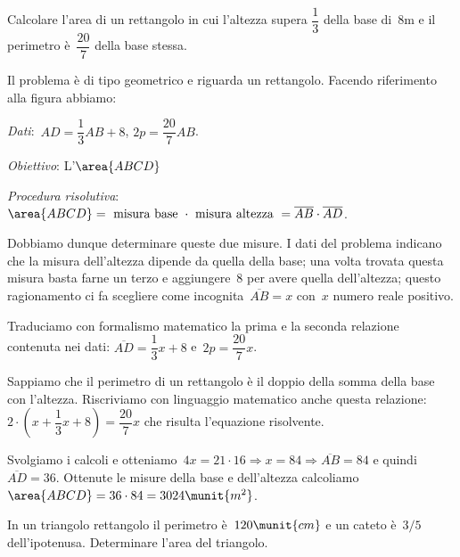 \begin{problema}{}{}
 Calcolare l'area di un rettangolo in cui
l'altezza supera \(\dfrac{1}{3}\) della base di~8m e il
perimetro è~\(\dfrac{20}{7}\) della base stessa.
\end{problema}

\begin{soluzione}
 Il problema è di tipo geometrico e riguarda un rettangolo. Facendo riferimento 
alla figura abbiamo:
\begin{htmulticols}{2}
 \emph{Dati}:~\(AD=\dfrac{1}{3}AB+8\), \(2p=\dfrac{20}{7}AB\).

\emph{Obiettivo}: L'\(\area{ABCD}\)

\begin{center}
 
\end{center}
\end{htmulticols}

\emph{Procedura risolutiva}:
\(\area{ABCD} = \text{ misura base }\cdot \text{ misura altezza 
}=\overline{AB}\cdot \overline{AD}\).

Dobbiamo dunque determinare queste due misure. I dati del problema
indicano che la misura dell'altezza dipende da quella
della base; una volta trovata questa misura basta farne un terzo e
aggiungere~8 per avere quella dell'altezza; questo
ragionamento ci fa scegliere come incognita~\(\overline{AB}=x\)
con~\(x\) numero reale positivo.

Traduciamo con formalismo matematico la prima e la seconda relazione
contenuta nei dati:
\(\overline{AD}=\dfrac{1}{3}x+8\) e~\(2p=\dfrac{20}{7}x\).

Sappiamo che il perimetro di un rettangolo è il doppio della somma
della base con l'altezza. Riscriviamo con linguaggio
matematico anche questa relazione:~\(2\cdot 
\left(x+\dfrac{1}{3}x+8\right)=\dfrac{20}{7}x\)
che risulta l'equazione risolvente.

Svolgiamo i calcoli e otteniamo~\(4x=21\cdot 16\Rightarrow 
x=84\Rightarrow\overline{AB}=84\) e quindi~\(\overline{AD}=36\).
Ottenute le misure della base e dell'altezza calcoliamo
\(\area{ABCD} =36\cdot 84 = 3024\munit{{m}^{2}}\).
\end{soluzione}

\begin{problema}{}{}
In un triangolo rettangolo il perimetro è~\(120\munit{cm}\) e un cateto 
è~\(3/5\) dell'ipotenusa. 
Determinare l'area del triangolo.
\end{problema}

